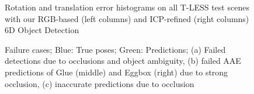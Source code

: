 {{\begin{figure}
	\captionsetup{width=0.8\textwidth}
	\caption{Rotation and translation error histograms on all T-LESS test scenes with our RGB-based (left columns) and ICP-refined (right columns) 6D Object Detection }
	\label{fig:histo}
\end{figure}
\begin{figure}[t]%
	\centering
	\caption{Failure cases; Blue: True poses; Green: Predictions; (a) Failed detections due to occlusions and object ambiguity, (b) failed AAE predictions of Glue (middle) and Eggbox (right) due to strong occlusion, (c) inaccurate predictions due to occlusion}
	\label{fig:failures}%
\end{figure}
}}
